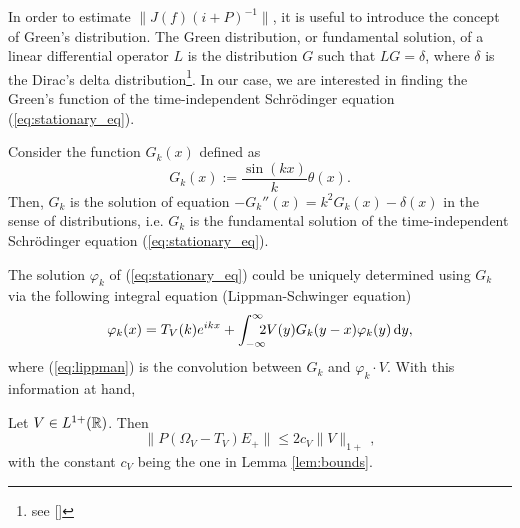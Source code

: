In order to estimate $\|J(f)(i+P)^{-1}\|$, it is useful to introduce the concept of Green's distribution. The Green distribution, or fundamental solution, of a linear differential operator $L$ is the distribution $G$ such that $LG=\delta$, where $\delta$ is the Dirac's delta distribution\footnote{see [\citealp[Chapt. 5, Sect. 3-4]{fried2}]}. In our case, we are interested in finding the Green's function of the time-independent Schr\"{o}dinger equation (\ref{eq:stationary_eq}).
\begin{prop}
	Consider the function $G_k(x)$ defined as 
	\begin{equation}
		G_k(x):=\frac{\sin(kx)}{k}\theta(x).
	\end{equation}
	Then, $G_k$ is the solution of equation $-G_k''(x)=k^2G_k(x)-\delta(x)$ in the sense of distributions, i.e. $G_k$ is the fundamental solution of the time-independent Schr\"{o}dinger equation (\ref{eq:stationary_eq}).
	\label{prop:green}
\end{prop}
The solution $\varphi_k$ of (\ref{eq:stationary_eq}) could be uniquely determined using $G_k$ via the following integral equation (Lippman-Schwinger equation) 
\begin{equation}
	\varphi_k(x)=T_V(k)e^{ikx}+\int_{-\infty}^{\infty}\!\!\!\! 2V(y)G_k(y-x)\varphi_k(y)\, \mathrm d y,
	\label{eq:lippman}
\end{equation}
where (\ref{eq:lippman}) is the convolution between $G_k$ and $\varphi_k\cdot V$. With this information at hand,
\begin{prop}
	\label{prop:bound5}
	Let $V\in L^{1+}({\mathbb R})$. Then
	\begin{equation}
		\|P(\Omega_V-T_V)E_+\|\le 2c_V\|V\|_{1+}\, ,
	\end{equation}
	with the constant $c_V$ being the one in Lemma \ref{lem:bounds}.
\end{prop}
